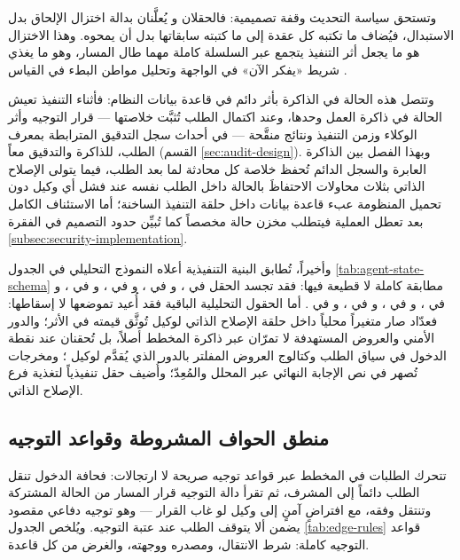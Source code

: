 وتستحق سياسة التحديث وقفة تصميمية: فالحقلان  و يُعلَّنان بدالة اختزال الإلحاق  بدل الاستبدال، فيُضاف ما تكتبه كل عقدة إلى ما كتبته سابقاتها بدل أن يمحوه. وهذا الاختزال هو ما يجعل أثر التنفيذ يتجمع عبر السلسلة كاملة مهما طال المسار، وهو ما يغذي شريط «يفكر الآن» في الواجهة وتحليل مواطن البطء في القياس .

وتتصل هذه الحالة في الذاكرة بأثر دائم في قاعدة بيانات النظام: فأثناء التنفيذ تعيش الحالة في ذاكرة العمل وحدها، وعند اكتمال الطلب تُثبَّت خلاصتها — قرار التوجيه وأثر الوكلاء وزمن التنفيذ ونتائج منقَّحة — في أحداث سجل التدقيق المترابطة بمعرف الطلب، للذاكرة والتدقيق معاً (القسم \ref{sec:audit-design}). وبهذا الفصل بين الذاكرة العابرة والسجل الدائم تُحفظ خلاصة كل محادثة لما بعد الطلب، فيما يتولى الإصلاح الذاتي بثلاث محاولات الاحتفاظَ بالحالة داخل الطلب نفسه عند فشل أي وكيل  دون تحميل المنظومة عبء قاعدة بيانات داخل حلقة التنفيذ الساخنة؛ أما الاستئناف الكامل بعد تعطل العملية فيتطلب مخزن حالة مخصصاً كما تُبيِّن حدود التصميم في الفقرة \ref{subsec:security-implementation}.

وأخيراً، تُطابق البنية التنفيذية أعلاه النموذج التحليلي في الجدول \ref{tab:agent-state-schema} مطابقة كاملة لا قطيعة فيها: فقد تجسد الحقل  في ، و في ، و في ، و في ، و في ، و في ، و في ، و في . أما الحقول التحليلية الباقية فقد أُعيد تموضعها لا إسقاطها: فعدّاد  صار متغيراً محلياً داخل حلقة الإصلاح الذاتي لوكيل  تُوثَّق قيمته في الأثر؛ والدور الأمني  والعروض المستهدفة  لا تمرّان عبر ذاكرة المخطط أصلاً، بل تُحقنان عند نقطة الدخول في سياق الطلب وكتالوج العروض المفلتر بالدور الذي يُقدَّم لوكيل ؛ ومخرجات  تُصهر في نص الإجابة النهائي عبر المحلل والمُعِدّ؛ وأُضيف حقل  تنفيذياً لتغذية فرع الإصلاح الذاتي.

\subsection{منطق الحواف المشروطة وقواعد التوجيه}
\label{subsec:agents-edges}

تتحرك الطلبات في المخطط عبر قواعد توجيه صريحة لا ارتجالات: فحافة الدخول تنقل الطلب دائماً إلى المشرف، ثم تقرأ دالة التوجيه  قرار المسار من الحالة المشتركة وتنتقل وفقه، مع افتراضٍ آمنٍ إلى وكيل  لو غاب القرار — وهو توجيه دفاعي مقصود يضمن ألا يتوقف الطلب عند عتبة التوجيه. ويُلخص الجدول \ref{tab:edge-rules} قواعد التوجيه كاملة: شرط الانتقال، ومصدره ووجهته، والغرض من كل قاعدة.

